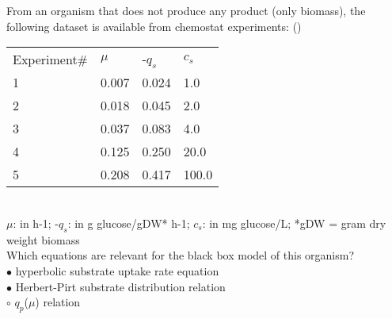 \documentclass[]{beamer}
\begin{document}
\begin{frame}[shrink] {} 
\color{blue}
From an organism that does not produce any product (only biomass), the following dataset is available from chemostat experiments: ({\color{green}{Q4a}})\\
\color{gray}
\begin{tabular}[ ]{l l l l} 
Experiment\# & $\mu$  & -$q_{s}$ & $c_{s}$   \\
1 & 0.007 & 0.024 & 1.0  \\
2 & 0.018 & 0.045 & 2.0  \\
3 & 0.037 & 0.083 & 4.0  \\
4 & 0.125 & 0.250 & 20.0  \\
5 & 0.208 & 0.417 & 100.0  \\
\end{tabular}  \\
\color{blue}
\footnotesize $\mu$: in h-1;  -$q_{s}$: in g glucose/gDW* h-1;  $c_{s}$: in mg glucose/L; *gDW = gram dry weight biomass\\
%
%
\normalsize Which equations are relevant for the black box model of this organism?\\
\color{black}
\setlength{\parindent}{-0.4cm}
{\color{red}$\bullet$}  hyperbolic substrate uptake rate equation \\
{\color{red}$\bullet$}  Herbert-Pirt substrate distribution relation \\
{\color{red}$\circ$}  $q_{p}$($\mu$) relation \\
\end{frame}
\end{document}
